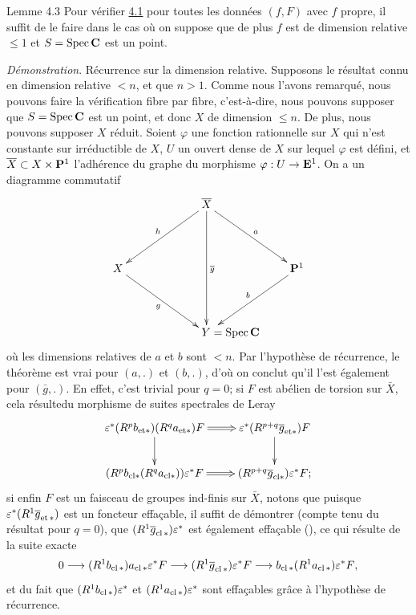 \documentclass[10pt]{../fichiers-configuration-latex/smfart}
\begin{document}
\begin{enonce*}{Lemme 4.3}
Pour vérifier \hyperref[XVI.thm4.1]{4.1} pour toutes les données $(f,F)$ avec $f$ propre,
il suffit de le faire dans le cas où on suppose que de plus $f$ est de
dimension relative $\leq 1$ et $S=\Spec \CC$ est un point.
\end{enonce*}

\noindent
\emph{Démonstration}. Récurrence sur la dimension relative. Supposons
le résultat connu en dimension relative $<n$, et que $n>1$. Comme nous
l'avons remarqué, nous pouvons faire la vérification fibre par fibre,
c'est-à-dire, nous pouvons supposer que $S=\Spec \CC$ est un
point, et donc $X$ de dimension $\leq n$. De plus, nous pouvons
supposer $X$ réduit. Soient $\varphi$ une fonction rationnelle sur $X$
qui n'est constante sur  irréductible de $X$, $U$ un
ouvert dense de $X$ sur lequel $\varphi$ est défini, et
$\bar{X}\subset X\times \PP^{1}$ l'adhérence du graphe du
morphisme $\varphi:U\rightarrow \EE^{1}$. On a un diagramme
commutatif
$$
\xymatrix@R=1.5cm@C=1.5cm{
&\bar{X}\ar[ld]_{h} \ar[rd]^{a} \ar[dd]^{\bar{g}}   &\\
X  \ar[rd]_{g}  &                                  &\PP^1 \ar[ld]_{b}\\
            & **[r]Y              =\Spec \CC&
}
$$
où les dimensions relatives de $a$ et $b$ sont $<n$. Par l'hypothèse
de récurrence, le théorème est vrai pour $(a,.)$ et $(b,.)$, d'où on
conclut qu'il l'est également pour $(\bar{g},.)$. En effet, c'est
trivial pour $q=0$; si $F$ est abélien de torsion sur
$\bar{X}$, cela résulte\pageoriginale du morphisme de suites
spectrales de Leray
$$
\xymatrix{
\varepsilon^{\ast}(R^{p}b_{\text{et}\ast})(R^{q}a_{\text{et}\ast})F \ar@{=>}[r] \ar[d]&
\varepsilon^{\ast}(R^{p+q}\bar{g}_{\text{et}\ast})F  \ar[d]\\
(R^{p}b_{\text{cl}\ast}(R^{q}{a_{\text{cl}\ast}}))
\varepsilon^{\ast}F  \ar@{=>}[r] & (R^{p+q}\bar{g}_{\text{cl}\ast})\varepsilon^{\ast}F;
}
$$
si enfin $F$ est un faisceau de groupes ind-finis sur $\bar{X}$,
notons que puisque $\epsilon^{\ast}(R^{1}\bar{g}_{\text{\rm
et\,}\ast})$ est un foncteur effaçable, il suffit de démontrer
(compte tenu du résultat pour $q=0$), que
$(R^{1}\bar{g}_{\cl\ast})\epsilon^{\ast}$ est également effaçable
(\cf {}), ce qui résulte de la suite exacte
$$
0\longrightarrow (R^{1}b_{\cl\ast})a_{\cl
\ast}\epsilon^{\ast}F\longrightarrow (R^{1}\bar{g}_{\cl
\ast})\epsilon^{\ast}F\longrightarrow b_{\cl \ast}(R^{1}a_{\cl
\ast})\epsilon^{\ast}F{\quoi},
$$
et du fait que $(R^{1}b_{\cl\ast})\epsilon^{\ast}$ et
$(R^{1}a_{\cl\ast})\epsilon^{\ast}$ sont effaçables grâce à
l'hypothèse de récurrence.
\end{document}
